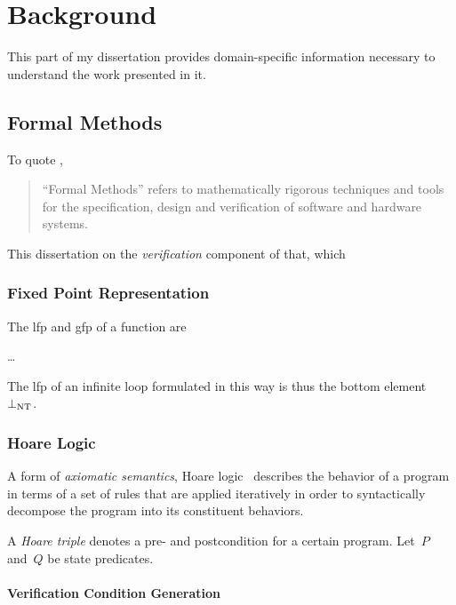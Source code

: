 \chapter{Background}\label{ch:background}
This part of my dissertation provides domain-specific information necessary to understand
the work presented in it.

\section{Formal Methods}
To quote \citet{butler:fm},
\begin{quote}
  ``Formal Methods''%
  refers to mathematically rigorous techniques and tools
  for the specification, design and verification of software and hardware systems.
\end{quote}
This dissertation on the \emph{verification} component of that,%
which 

\subsection{Fixed Point Representation}
The \ac{lfp} and \ac{gfp} of a function are

\todo\dots

The \ac{lfp} of an infinite loop formulated in this way
is thus the bottom element $\bot_\mathrm{NT}$.%

\subsection{Hoare Logic}\label{se:hoare}
A form of \emph{axiomatic semantics},
Hoare logic~\citep{hoare1969axiomatic,myreen2007hoare}%
describes the behavior of a program
in terms of a set of rules that are applied iteratively
in order to syntactically decompose the program into its constituent behaviors.

A \emph{Hoare triple} denotes a pre- and postcondition for a certain program.%
%
%
Let~$P$ and~$Q$ be state predicates.


\subsubsection{Verification Condition Generation}

